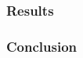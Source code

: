 \documentclass[
]{article}
\begin{document}
\hypertarget{results}{%
\subsubsection{Results}\label{results}}

\hypertarget{conclusion}{%
\subsubsection{Conclusion}\label{conclusion}}
\end{document}
